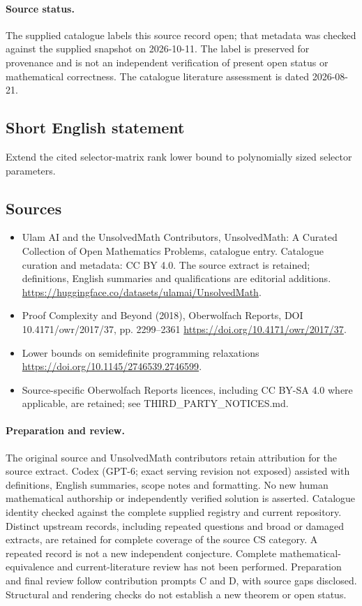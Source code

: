 \documentclass[11pt]{article}
\begin{document}
\paragraph{Source status.}
The supplied catalogue labels this source record open; that metadata was checked against the supplied snapshot on 2026-10-11. The label is preserved for provenance and is not an independent verification of present open status or mathematical correctness. The catalogue literature assessment is dated 2026-08-21.
\subsection{Short English statement}
Extend the cited selector-matrix rank lower bound to polynomially sized selector parameters.
\subsection{Sources}
\begin{itemize}
\item[S1] Ulam AI and the UnsolvedMath Contributors, UnsolvedMath: A Curated Collection of Open Mathematics Problems, catalogue entry. Catalogue curation and metadata: CC BY 4.0. The source extract is retained; definitions, English summaries and qualifications are editorial additions.
\url{https://huggingface.co/datasets/ulamai/UnsolvedMath}.
\item[S2] Proof Complexity and Beyond (2018), Oberwolfach Reports, DOI 10.4171/owr/2017/37, pp. 2299--2361
\url{https://doi.org/10.4171/owr/2017/37}.
\item[S3] Lower bounds on semidefinite programming relaxations
\url{https://doi.org/10.1145/2746539.2746599}.
\item Source-specific Oberwolfach Reports licences, including CC BY-SA 4.0 where applicable, are retained; see THIRD\_PARTY\_NOTICES.md.
\end{itemize}
\paragraph{Preparation and review.}
The original source and UnsolvedMath contributors retain attribution for the source extract. Codex (GPT-6; exact serving revision not exposed) assisted with definitions, English summaries, scope notes and formatting. No new human mathematical authorship or independently verified solution is asserted. Catalogue identity checked against the complete supplied registry and current repository. Distinct upstream records, including repeated questions and broad or damaged extracts, are retained for complete coverage of the source CS category. A repeated record is not a new independent conjecture. Complete mathematical-equivalence and current-literature review has not been performed. Preparation and final review follow contribution prompts C and D, with source gaps disclosed. Structural and rendering checks do not establish a new theorem or open status.
\label{end:statement}
\end{document}
